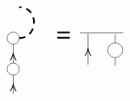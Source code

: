 \begin{equation}
\begin{tikzpicture}[x=0.55pt,y=0.55pt,yscale=-1,xscale=1]
\draw   (342.75,96.08) .. controls (342.75,90.74) and (347.12,86.4) .. (352.5,86.4) .. controls (357.88,86.4) and (362.25,90.74) .. (362.25,96.08) .. controls (362.25,101.43) and (357.88,105.77) .. (352.5,105.77) .. controls (347.12,105.77) and (342.75,101.43) .. (342.75,96.08) -- cycle ;
\draw    (352.5,136.08) -- (352.5,105.77) ;
\draw [shift={(352.5,120.93)}, rotate = 450] [color={rgb, 255:red, 0; green, 0; blue, 0 }  ][line width=0.75]    (10.93,-4.9) .. controls (6.95,-2.3) and (3.31,-0.67) .. (0,0) .. controls (3.31,0.67) and (6.95,2.3) .. (10.93,4.9)   ;
\draw   (342.75,145.77) .. controls (342.75,140.42) and (347.12,136.08) .. (352.5,136.08) .. controls (357.88,136.08) and (362.25,140.42) .. (362.25,145.77) .. controls (362.25,151.12) and (357.88,155.45) .. (352.5,155.45) .. controls (347.12,155.45) and (342.75,151.12) .. (342.75,145.77) -- cycle ;
\draw    (352.5,185.77) -- (352.5,155.45) ;
\draw [shift={(352.5,170.61)}, rotate = 450] [color={rgb, 255:red, 0; green, 0; blue, 0 }  ][line width=0.75]    (10.93,-4.9) .. controls (6.95,-2.3) and (3.31,-0.67) .. (0,0) .. controls (3.31,0.67) and (6.95,2.3) .. (10.93,4.9)   ;
\draw [line width=1.5]  [dash pattern={on 5.63pt off 4.5pt}]  (362.25,96.08) .. controls (394.25,95.4) and (394.25,45.4) .. (362.25,46.4) ;
\draw [line width=1.5]    (424,87.02) -- (444.25,87.02) ;
\draw [line width=1.5]    (424,95.4) -- (444.25,95.4) ;

\draw    (473.67,138.63) -- (473.67,88.63) ;
\draw [shift={(473.67,113.63)}, rotate = 450] [color={rgb, 255:red, 0; green, 0; blue, 0 }  ][line width=0.75]    (10.93,-4.9) .. controls (6.95,-2.3) and (3.31,-0.67) .. (0,0) .. controls (3.31,0.67) and (6.95,2.3) .. (10.93,4.9)   ;
\draw    (517.71,103.59) -- (517.71,89.63) ;
\draw   (505.75,115.47) .. controls (505.75,108.91) and (511.1,103.59) .. (517.71,103.59) .. controls (524.31,103.59) and (529.67,108.91) .. (529.67,115.47) .. controls (529.67,122.03) and (524.31,127.35) .. (517.71,127.35) .. controls (511.1,127.35) and (505.75,122.03) .. (505.75,115.47) -- cycle ;
\draw    (517.71,140.63) -- (517.71,127.35) ;
\draw    (460.67,87.63) -- (530.67,87.63) ;



\end{tikzpicture}
\end{equation}
